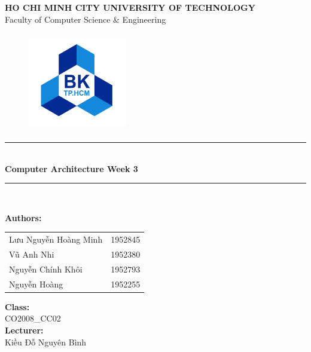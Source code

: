 \documentclass[12pt,a4paper]{article}
\newcommand\HRule{\rule{12cm}{1pt}}
\begin{document}
\begin{titlepage}

  \begin{center}

    \textbf{\fontsize{12pt}{1pt}\selectfont HO CHI MINH CITY UNIVERSITY OF TECHNOLOGY}\\[0.5cm]
    {\fontsize{13pt}{1pt}\selectfont Faculty of Computer Science \& Engineering}\\[0.5cm]
    \begin{figure}[H]
      \centering
      \includegraphics[width=1.7in,height=1.7in]{BK.png}
    \end{figure}

    \HRule\\[0.5cm]
    { \textbf{\fontsize{25pt}{1pt}\selectfont Computer Architecture Week 3}}\\[0.4cm]

    \HRule\\[0.8cm]
    \begin{minipage}{0.545\textwidth}
      \begin{flushleft}
        \textbf{Authors:}\\
        \begin{tabular}{l l}
          Lưu Nguyễn Hoàng Minh & 1952845 \\
          Vũ Anh Nhi            & 1952380 \\
          Nguyễn Chính Khôi     & 1952793 \\
          Nguyễn Hoàng          & 1952255 \\
        \end{tabular}
      \end{flushleft}
    \end{minipage}
    \begin{minipage}{0.4\textwidth}
      \begin{flushright}
        \textbf{Class:}\\
        CO2008\_CC02\\
        \textbf{Lecturer:}\\
        Kiều Đỗ Nguyên Bình\\


\end{flushright}
\end{minipage}
\end{center}
\end{titlepage}
\end{document}
